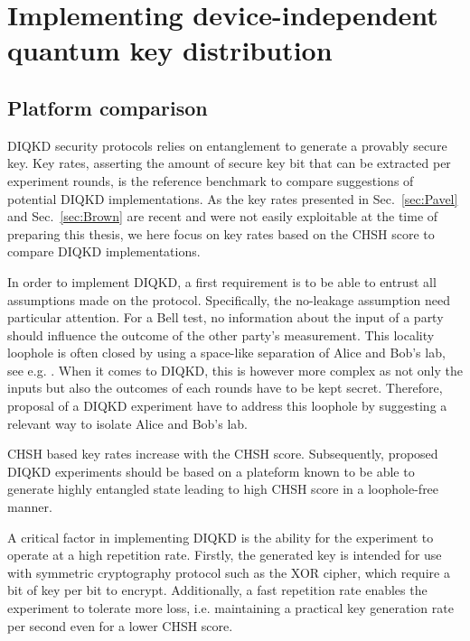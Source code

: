 \chapter{Implementing device-independent quantum key distribution}

\section{Platform comparison}

DIQKD security protocols relies on entanglement to generate a provably secure key.
Key rates, asserting the amount of secure key bit that can be extracted per experiment rounds, is the reference benchmark to compare suggestions of potential DIQKD implementations.
As the key rates presented in Sec.~\ref{sec:Pavel} and Sec.~\ref{sec:Brown} are recent and were not easily exploitable at the time of preparing this thesis, we here focus on key rates based on the CHSH score to compare DIQKD implementations.

\medbreak

In order to implement DIQKD, a first requirement is to be able to entrust all assumptions made on the protocol.
Specifically, the no-leakage assumption need particular attention.
For a Bell test, no information about the input of a party should influence the outcome of the other party's measurement.
This locality loophole is often closed by using a space-like separation of Alice and Bob's lab, see e.g. \cite{Hensen2015,Giustina2015,Shalm2015}.
When it comes to DIQKD, this is however more complex as not only the inputs but also the outcomes of each rounds have to be kept secret.
Therefore, proposal of a DIQKD experiment have to address this loophole by suggesting a relevant way to isolate Alice and Bob's lab.

\medbreak

CHSH based key rates increase with the CHSH score.
Subsequently, proposed DIQKD experiments should be based on a plateform known to be able to generate highly entangled state leading to high CHSH score in a loophole-free manner.

\medbreak

A critical factor in implementing DIQKD is the ability for the experiment to operate at a high repetition rate.
Firstly, the generated key is intended for use with symmetric cryptography protocol such as the XOR cipher, which require a bit of key per bit to encrypt.
Additionally, a fast repetition rate enables the experiment to tolerate more loss, i.e. maintaining a practical key generation rate per second even for a lower CHSH score.

